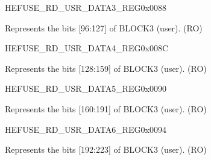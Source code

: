 \begin{register}{H}{EFUSE\_RD\_USR\_DATA3\_REG}{0x{}0088}\label{regdesc:EFUSERDUSRDATA3REG}
%
\regnewline%
\begin{regdesc}\begin{reglist}
\label{fielddesc:EFUSEUSRDATA3}\item [EFUSE\_USR\_DATA3] Represents the bits [96:127] of BLOCK3 (user). (RO)
\end{reglist}\end{regdesc}
\end{register}


\begin{register}{H}{EFUSE\_RD\_USR\_DATA4\_REG}{0x{}008C}\label{regdesc:EFUSERDUSRDATA4REG}
%
\regnewline%
\begin{regdesc}\begin{reglist}
\label{fielddesc:EFUSEUSRDATA4}\item [EFUSE\_USR\_DATA4] Represents the bits [128:159] of BLOCK3 (user). (RO)
\end{reglist}\end{regdesc}
\end{register}


\begin{register}{H}{EFUSE\_RD\_USR\_DATA5\_REG}{0x{}0090}\label{regdesc:EFUSERDUSRDATA5REG}
%
\regnewline%
\begin{regdesc}\begin{reglist}
\label{fielddesc:EFUSEUSRDATA5}\item [EFUSE\_USR\_DATA5] Represents the bits [160:191] of BLOCK3 (user). (RO)
\end{reglist}\end{regdesc}
\end{register}


\begin{register}{H}{EFUSE\_RD\_USR\_DATA6\_REG}{0x{}0094}\label{regdesc:EFUSERDUSRDATA6REG}
%
\regnewline%
\begin{regdesc}\begin{reglist}
\label{fielddesc:EFUSEUSRDATA6}\item [EFUSE\_USR\_DATA6] Represents the bits [192:223] of BLOCK3 (user). (RO)
\end{reglist}\end{regdesc}
\end{register}


